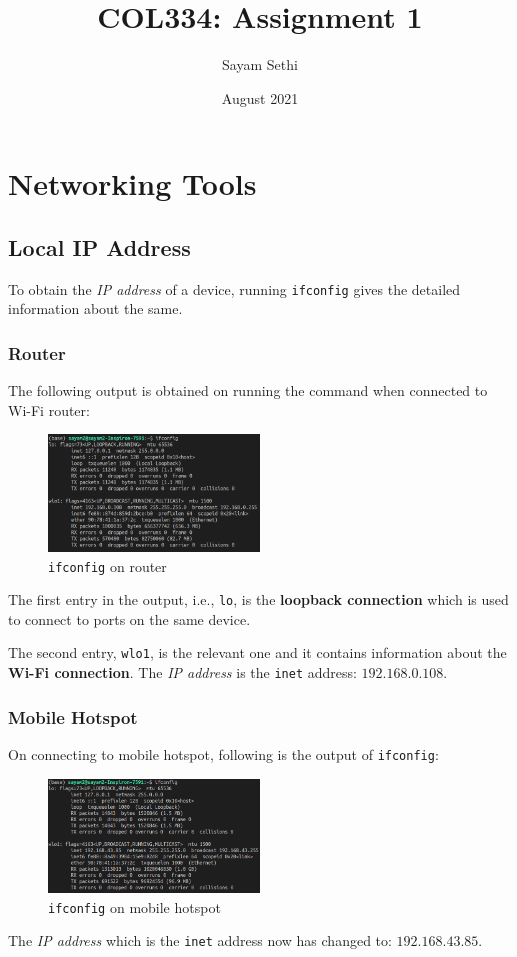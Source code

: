 \documentclass[11pt]{article}
\title{COL334: Assignment 1}
\author{Sayam Sethi}
\date{August 2021}
\begin{document}
\maketitle

\tableofcontents

\section{Networking Tools}

\subsection{Local IP Address}
To obtain the \textit{IP address} of a device, running \texttt{ifconfig} gives the detailed information about the same.

\subsubsection{Router}
The following output is obtained on running the command when connected to Wi-Fi router:
\begin{figure}[H]
    \centering
    \includegraphics[width=0.5\textwidth]{ifconfig_router.png}
    \caption{\texttt{ifconfig} on router}
\end{figure}
The first entry in the output, i.e., \texttt{lo}, is the \textbf{loopback connection} which is used to connect to ports on the same device.\par
The second entry, \texttt{wlo1}, is the relevant one and it contains information about the \textbf{Wi-Fi connection}. The \textit{IP address} is the \texttt{inet} address: $192.168.0.108$.

\subsubsection{Mobile Hotspot}
On connecting to mobile hotspot, following is the output of \texttt{ifconfig}:
\begin{figure}[H]
    \centering
    \includegraphics[width=0.5\textwidth]{ifconfig_hotspot.png}
    \caption{\texttt{ifconfig} on mobile hotspot}
\end{figure}
The \textit{IP address} which is the \texttt{inet} address now has changed to: $192.168.43.85$.
\end{document}

